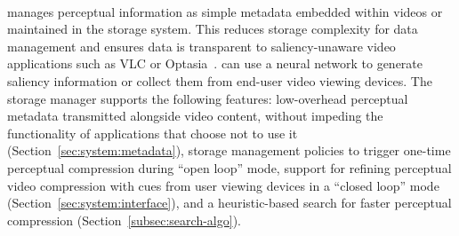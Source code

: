 \paragraph{\nameStore} manages perceptual information as simple metadata embedded within videos or maintained in the storage system.
This reduces storage complexity for data management and ensures \name data is transparent to saliency-unaware video applications such as VLC or Optasia~\cite{optasia2016lu}.
\nameStore can use a neural network to generate saliency information or collect them from end-user video viewing devices.
The storage manager supports the following features: low-overhead perceptual metadata transmitted alongside video content, without impeding the functionality of applications that choose not to use it (Section~\ref{sec:system:metadata}), storage management policies to trigger one-time perceptual compression during ``open loop'' mode, support for refining perceptual video compression with cues from user viewing devices in a ``closed loop'' mode (Section~\ref{sec:system:interface}), and a heuristic-based search for faster perceptual compression (Section~\ref{subsec:search-algo}).
